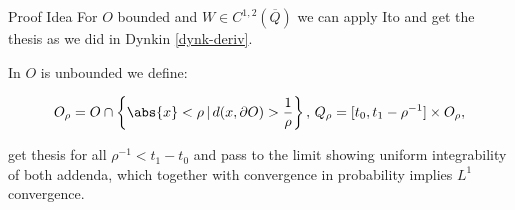 \documentclass[10pt, compress]{beamer}
\begin{document}
\begin{frame}{Proof Idea}
    For $O$ bounded and $W\in C^{1,2}(\overline{Q})$ we can apply Ito and get the thesis as we did in Dynkin \ref{dynk-deriv}.

    In $O$ is unbounded we define:

    \[O_{\rho} = O\cap\left\{\abs{x}<\rho\,|\,d(x,\partial O)>\frac{1}{\rho}\right\},\, Q_{\rho} = [t_0,t_1-\rho^{-1}]\times O_{\rho},\]

    get thesis for all $\rho^{-1}<t_1-t_0$ and pass to the limit showing uniform integrability of both addenda, which together with convergence in probability implies $L^1$ convergence.
\end{frame}
\end{document}

